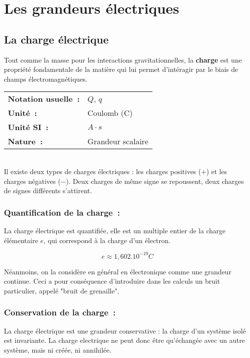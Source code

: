 \chapter{Les grandeurs électriques}

\section{La charge électrique}

Tout comme la masse pour les interactions gravitationnelles, la \textbf{charge} est une propriété fondamentale de la matière qui lui permet d'intéragir par le biais de champs électromagnétiques. \\

\begin{tabular}{ll}
\textbf{Notation usuelle~:} & $Q$, $q$ \\
	\textbf{Unité~:} & Coulomb (C) \\
\textbf{Unité SI~:} & $A \cdot s $ \\
\textbf{Nature~:} & Grandeur scalaire \\
\end{tabular} \\

Il existe deux types de charges électriques : les charges positives ($+$) et les charges négatives ($-$). Deux charges de même signe se repoussent, deux charges de signes différents s'attirent.

\subsection*{ Quantification de la charge~: }

La charge électrique est quantifiée, elle est un multiple entier de la charge élémentaire $e$, qui correspond à la charge d'un électron. 

$$e \approx 1,602.10^{-19} C$$

Néanmoins, on la considère en général en électronique comme une grandeur continue. Ceci a pour conséquence d'introduire dans les calculs un bruit particulier, appelé "bruit de grenaille". 

\subsection*{ Conservation de la charge~: }

La charge électrique est une grandeur conservative : la charge d'un système isolé est invariante. La charge electrique ne peut donc être qu'échangée avec un autre système, mais ni créée, ni annihilée.

